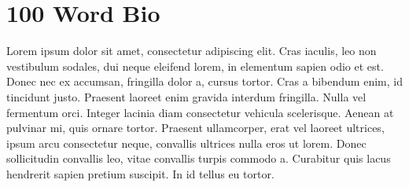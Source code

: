 \section*{100 Word Bio}
Lorem ipsum dolor sit amet, consectetur adipiscing elit. Cras
iaculis, leo non vestibulum sodales, dui neque eleifend lorem, in
elementum sapien odio et est. Donec nec ex accumsan, fringilla
dolor a, cursus tortor. Cras a bibendum enim, id tincidunt justo.
Praesent laoreet enim gravida interdum fringilla. Nulla vel
fermentum orci. Integer lacinia diam consectetur vehicula
scelerisque. Aenean at pulvinar mi, quis ornare tortor. Praesent
ullamcorper, erat vel laoreet ultrices, ipsum arcu consectetur
neque, convallis ultrices nulla eros ut lorem. Donec sollicitudin
convallis leo, vitae convallis turpis commodo a. Curabitur quis
lacus hendrerit sapien pretium suscipit. In id tellus eu tortor. 
